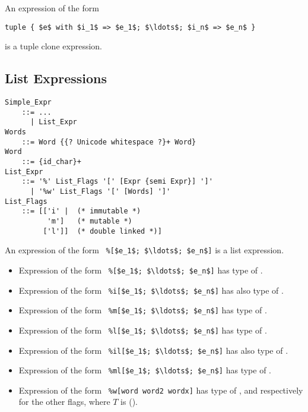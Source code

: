 An expression of the form 
\begin{lstlisting}
tuple { $e$ with $i_1$ => $e_1$; $\ldots$; $i_n$ => $e_n$ }
\end{lstlisting}
is a tuple clone expression. 





\subsection{List Expressions}
\label{sec:list-expressions}

\grammar\begin{lstlisting}
Simple_Expr 
    ::= ...
      | List_Expr
Words
    ::= Word {{? Unicode whitespace ?}+ Word}
Word
    ::= {id_char}+
List_Expr
    ::= '%' List_Flags '[' [Expr {semi Expr}] ']'
      | '%w' List_Flags '[' [Words] ']'
List_Flags
    ::= [['i' |  (* immutable *)
          'm']   (* mutable *)
         ['l']]  (* double linked *)]
\end{lstlisting}

An expression of the form ~\lstinline!%[$e_1$; $\ldots$; $e_n$]! is a list expression. 

\begin{itemize}
  \item Expression of the form ~\lstinline!%[$e_1$; $\ldots$; $e_n$]!
    has type of . 
  \item Expression of the form ~\lstinline!%i[$e_1$; $\ldots$; $e_n$]!
    has also type of . 
  \item Expression of the form ~\lstinline!%m[$e_1$; $\ldots$; $e_n$]!
    has type of . 
  \item Expression of the form ~\lstinline!%l[$e_1$; $\ldots$; $e_n$]!
    has type of . 
  \item Expression of the form ~\lstinline!%il[$e_1$; $\ldots$; $e_n$]!
    has also type of . 
  \item Expression of the form ~\lstinline!%ml[$e_1$; $\ldots$; $e_n$]!
    has type of . 
  \item Expression of the form ~\lstinline!%w[word word2 wordx]!
    has type of , and respectively for the other flags, where $T$ is  (). 
\end{itemize}

